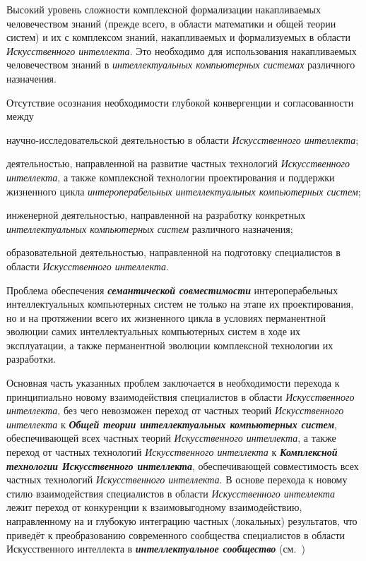 \begin{textitemize}
	\medskip
	\item 
	Высокий уровень сложности комплексной формализации  накапливаемых человечеством знаний (прежде всего, в области математики и общей теории систем) и их  с комплексом знаний, накапливаемых и формализуемых в области \textit{Искусственного интеллекта}. Это необходимо для  использования накапливаемых человечеством знаний в \textit{интеллектуальных компьютерных системах} различного назначения.
	\medskip
	\item 
	Отсутствие осознания необходимости глубокой конвергенции и согласованности между
	\begin{textitemize}
		\item научно-исследовательской деятельностью в области \textit{Искусственного интеллекта};
		\item деятельностью, направленной на развитие частных технологий \textit{Искусственного интеллекта}, а также комплексной технологии проектирования и поддержки жизненного цикла \textit{интероперабельных интеллектуальных компьютерных систем};
		\item инженерной деятельностью, направленной на разработку конкретных \textit{интеллектуальных компьютерных систем} различного назначения;
		\item образовательной деятельностью, направленной на подготовку специалистов в области \textit{Искусственного интеллекта}.
	\end{textitemize}
	\item 
	Проблема обеспечения \textbf{\textit{семантической совместимости}} интероперабельных интеллектуальных компьютерных систем не только на этапе их проектирования, но и на протяжении всего их жизненного цикла в условиях перманентной эволюции самих интеллектуальных компьютерных систем в ходе их эксплуатации, а также перманентной эволюции комплексной технологии их разработки.
\end{textitemize}

Основная часть указанных проблем заключается в необходимости перехода к принципиально новому   взаимодействия специалистов в области \textit{Искусственного интеллекта}, без чего невозможен переход от частных теорий \textit{Искусственного интеллекта} к \textbf{\textit{Общей теории интеллектуальных компьютерных систем}}, обеспечивающей  всех частных теорий \textit{Искусственного интеллекта}, а также переход от частных технологий \textit{Искусственного интеллекта} к \textbf{\textit{Комплексной технологии Искусственного интеллекта}}, обеспечивающей совместимость всех частных технологий \textit{Искусственного интеллекта}. В основе перехода к новому стилю взаимодействия специалистов в области \textit{Искусственного интеллекта} лежит переход от конкуренции к  взаимовыгодному взаимодействию, направленному на  и глубокую интеграцию частных (локальных) результатов, что приведёт к преобразованию современного сообщества специалистов в области Искусственного интеллекта в \textbf{\textit{интеллектуальное сообщество}} (см.~\cite{Tarasov2002})

